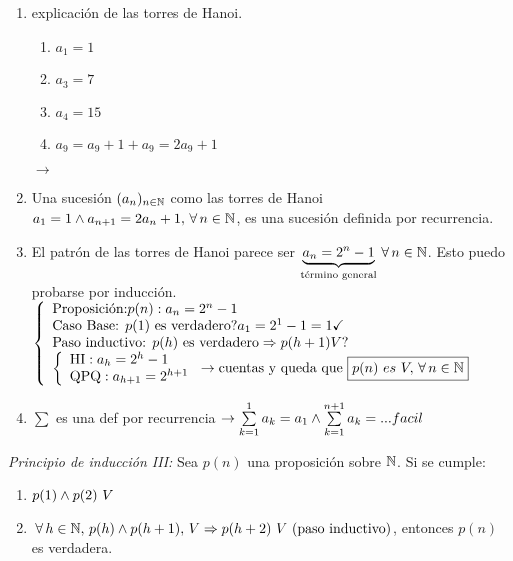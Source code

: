 \documentclass[12pt,a4paper, spanish]{article}
\begin{document}
\begin{enumerate}
	\item explicación de las torres de Hanoi.
	      \begin{enumerate}[label=\arabic*)]
		      \item $a_1 = 1$
		      \item $a_3 = 7$
		      \item $a_4 = 15$
		      \item $a_9 = a_9 +1+a_9 = 2 a_9 +1$
	      \end{enumerate}
	      $\to$ 

	\item Una sucesión $(a_n)_{n \in \mathbb N}$ como las torres de Hanoi $a_1 = 1 \land a_{n+1}= 2a_n + 1, \,\forall\, n \in \mathbb N$, es una
	      sucesión definida por recurrencia.\\

	\item El patrón de las torres de Hanoi parece ser $\underbrace{a_n = 2^n -1 }_{\text{término general}} \paratodo n \en \naturales$.
	      Esto puedo probarse por inducción.
	      $ \llave{l}{
			      \text{Proposición:} p(n): a_n = 2^n -1\\
			      \text{Caso Base: } p(1) \text{ es verdadero?} a_1 = 2^1 -1 =1 \checkmark\\
			      \text{Paso inductivo: } p(h) \text{ es verdadero}  \entonces p(h+1) V?\\

			      \llave{l}{
				      \text{HI}:  a_h = 2^h -1\\
				      \text{QPQ}: a_{h+1} = 2^{h+1}
			      } \to \text{cuentas y queda que }  \boxed{ p(n)\ es\ V, \paratodo n \en \naturales}
		      } $

	\item $\sum$ es una def por recurrencia $\to \sum\limits_{k=1}^{1} a_k = a_1 \land \sum\limits_{k=1}^{n+1} a_k =... facil $

\end{enumerate}


\textit{Principio de inducción III: } Sea $p(n)$ una proposición sobre $\mathbb N$. Si se cumple:
\begin{enumerate}
	\item  $p(1) \land p(2) \ V$
	\item $\,\forall\, h \in \mathbb N,\, p(h) \land p(h+1),\, V \Rightarrow p(h+2)\ V\ (\text{paso inductivo})$,
	      entonces $p(n)$ es verdadera.
\end{enumerate}
\end{document}
